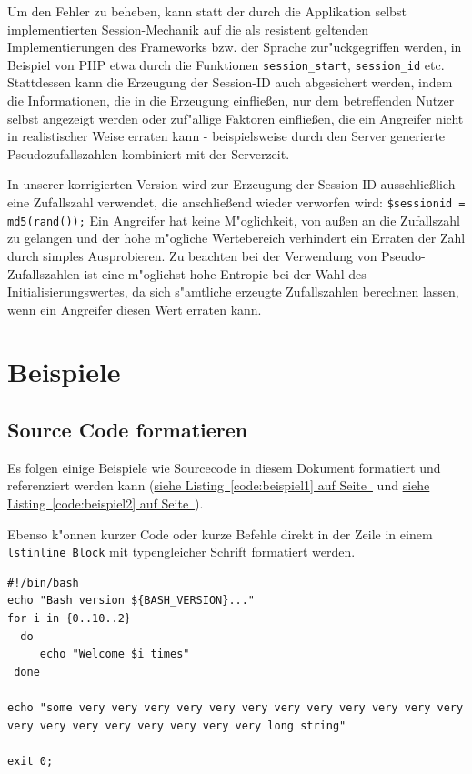 \documentclass[12pt,a4paper,titlepage,oneside]{scrartcl}
\begin{document}
Um den Fehler zu beheben, kann statt der durch die Applikation selbst implementierten Session-Mechanik auf die als resistent geltenden Implementierungen des Frameworks bzw. der Sprache zur"uckgegriffen werden, in Beispiel von PHP etwa durch die Funktionen \texttt{session\_start}, \texttt{session\_id} etc. Stattdessen kann die Erzeugung der Session-ID auch abgesichert werden, indem die Informationen, die in die Erzeugung einfließen, nur dem betreffenden Nutzer selbst angezeigt werden oder zuf"allige Faktoren einfließen, die ein Angreifer nicht in realistischer Weise erraten kann - beispielsweise durch den Server generierte Pseudozufallszahlen kombiniert mit der Serverzeit. 

In unserer korrigierten Version wird zur Erzeugung der Session-ID ausschließlich eine Zufallszahl verwendet, die anschließend wieder verworfen wird: \lstinline{$sessionid = md5(rand());} Ein Angreifer hat keine M"oglichkeit, von außen an die Zufallszahl zu gelangen und der hohe m"ogliche Wertebereich verhindert ein Erraten der Zahl durch simples Ausprobieren. Zu beachten bei der Verwendung von Pseudo-Zufallszahlen ist eine m"oglichst hohe Entropie bei der Wahl des Initialisierungswertes, da sich s"amtliche erzeugte Zufallszahlen berechnen lassen, wenn ein Angreifer diesen Wert erraten kann.

\section{Beispiele}

\subsection{Source Code formatieren}
Es folgen einige Beispiele wie Sourcecode in diesem Dokument formatiert und referenziert werden kann
(\hyperref[code:beispiel1]{siehe Listing~\ref*{code:beispiel1} auf Seite~\pageref*{code:beispiel1}} und \hyperref[code:beispiel2]{siehe Listing~\ref*{code:beispiel2} auf Seite~\pageref*{code:beispiel2}}).

Ebenso k"onnen kurzer Code oder kurze Befehle direkt in der Zeile in einem \lstinline{lstinline Block} mit typengleicher Schrift formatiert werden.

%

\begin{lstlisting}[caption=Example bash script,label=code:beispiel2,style=simple]
#!/bin/bash
echo "Bash version ${BASH_VERSION}..."
for i in {0..10..2}
  do
     echo "Welcome $i times"
 done

echo "some very very very very very very very very very very very very very very very very very very very very long string"

exit 0;
\end{lstlisting}
\end{document}
